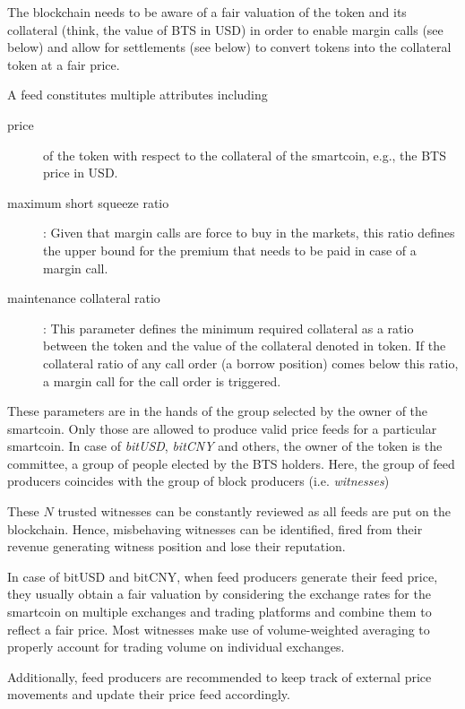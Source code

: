 \label{sec:feeds}

The blockchain needs to be aware of a fair valuation of the token and its
collateral (think, the value of BTS in USD) in order to enable margin calls
(see below) and allow for settlements (see below) to convert tokens into the
collateral token at a fair price.

A feed constitutes multiple attributes including
\begin{description}
 \item[price] of the token with respect to the collateral of the smartcoin,
  e.g., the BTS price in USD.
 \item[maximum short squeeze ratio]: Given that margin calls are force to buy
  in the markets, this ratio defines the upper bound for the premium that needs
  to be paid in case of a margin call.
 \item[maintenance collateral ratio]: This parameter defines the minimum
  required collateral as a ratio between the token and the value of the
  collateral denoted in token. If the collateral ratio of any call order (a
  borrow position) comes below this ratio, a margin call for the call order is
  triggered.
\end{description}

These parameters are in the hands of the group selected by the owner of the
smartcoin. Only those are allowed to produce valid price feeds for a particular
smartcoin. In case of \emph{bitUSD}, \emph{bitCNY} and others, the owner of the
token is the committee, a group of people elected by the BTS holders. Here, the
group of feed producers coincides with the group of block producers (i.e.
\emph{witnesses})

These $N$ trusted witnesses can be constantly reviewed as all feeds are put on
the blockchain. Hence, misbehaving witnesses can be identified, fired from
their revenue generating witness position and lose their reputation.

In case of bitUSD and bitCNY, when feed producers generate their feed price,
they usually obtain a fair valuation by considering the exchange rates for the
smartcoin on multiple exchanges and trading platforms and combine them to
reflect a fair price. Most witnesses make use of volume-weighted averaging to
properly account for trading volume on individual exchanges.

Additionally, feed producers are recommended to keep track of external price
movements and update their price feed accordingly.

